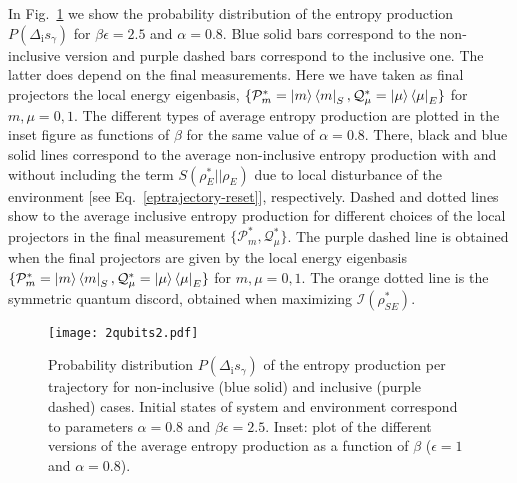 \documentclass[aps,prx,twocolumn,showpacs,floatfix,superscriptaddress,graphics,longbibliography]{revtex4-1}
\begin{document}
In Fig.~\ref{F-qubits} we show the  probability distribution of the entropy production $P(\Delta_\mathrm{i} s_\gamma)$ for $\beta\epsilon = 2.5 $ and $\alpha = 0.8$. Blue solid bars correspond to the non-inclusive version and purple dashed bars correspond to the inclusive one. The latter does depend on the final measurements. Here we have taken as final projectors the local energy eigenbasis,  $\{ \mathcal{P}_m^\ast = \ket{m}\bra{m}_S, \mathcal{Q}_\mu^\ast = \ket{\mu}\bra{\mu}_E\}$ for $m,\mu = 0,1$.
The different types of average entropy production are plotted in the inset figure as functions of $\beta$ for the same value of $\alpha=0.8$.
There, black and blue solid lines correspond to the average non-inclusive entropy production with and without including the term $S(\rho_{E}^\ast || \rho_E)$ due to local disturbance of the  environment [see Eq.~\eqref{eptrajectory-reset}], respectively. 
Dashed and dotted lines show
to the average inclusive entropy production  for different choices of the local projectors in the final measurement $\{ \mathcal{P}_m^\ast, \mathcal{Q}_\mu^\ast\}$. The purple dashed line is obtained when the final projectors are given by the local energy eigenbasis $\{ \mathcal{P}_m^\ast = \ket{m}\bra{m}_S, \mathcal{Q}_\mu^\ast = \ket{\mu}\bra{\mu}_E\}$ for $m,\mu = 0,1$. The orange dotted line is the symmetric quantum discord, obtained when 
maximizing $\mathcal{I}(\rho_{SE}^\ast)$. 




\begin{figure}[t]
\texttt{[image: 2qubits2.pdf]}
\caption{Probability distribution $P(\Delta_\mathrm{i} s_\gamma)$ of the entropy production per trajectory  for non-inclusive (blue solid) and inclusive (purple dashed) cases. Initial states of system and environment correspond to parameters 
$\alpha = 0.8$ and $\beta \epsilon= 2.5$. Inset: plot of the different versions of the average entropy production as a function of $\beta$ ($\epsilon = 1$ and $\alpha=0.8$).} 
\label{F-qubits}
\end{figure}
\end{document}
